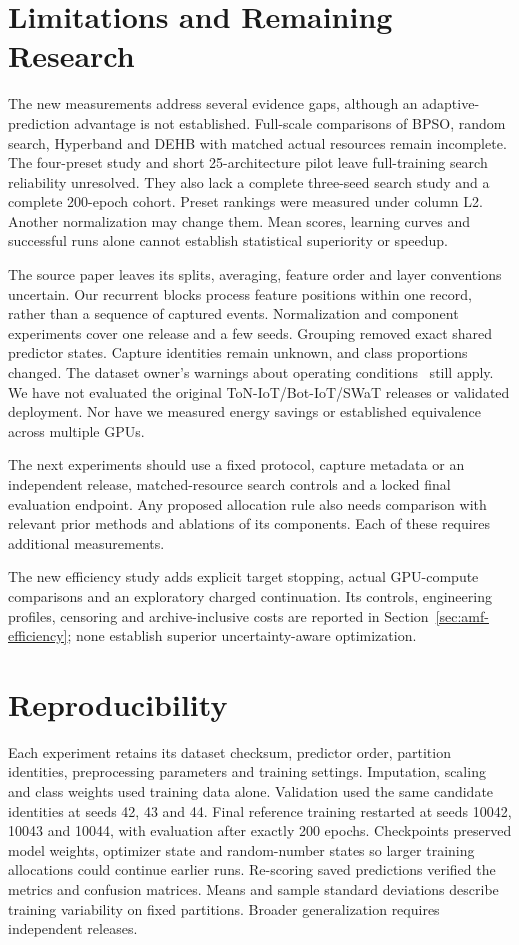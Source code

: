 \FloatBarrier



\section{Limitations and Remaining Research}
The new measurements address several evidence gaps, although an adaptive-prediction advantage is not established. Full-scale comparisons of BPSO, random search, Hyperband and DEHB with matched actual resources remain incomplete. The four-preset study and short 25-architecture pilot leave full-training search reliability unresolved. They also lack a complete three-seed search study and a complete 200-epoch cohort. Preset rankings were measured under column L2. Another normalization may change them. Mean scores, learning curves and successful runs alone cannot establish statistical superiority or speedup.

The source paper leaves its splits, averaging, feature order and layer conventions uncertain. Our recurrent blocks process feature positions within one record, rather than a sequence of captured events. Normalization and component experiments cover one release and a few seeds. Grouping removed exact shared predictor states. Capture identities remain unknown, and class proportions changed. The dataset owner's warnings about operating conditions~\cite{morrisdata,hsu2014} still apply. We have not evaluated the original ToN-IoT/Bot-IoT/SWaT releases or validated deployment. Nor have we measured energy savings or established equivalence across multiple GPUs.

The next experiments should use a fixed protocol, capture metadata or an independent release, matched-resource search controls and a locked final evaluation endpoint. Any proposed allocation rule also needs comparison with relevant prior methods and ablations of its components. Each of these requires additional measurements.

The new efficiency study adds explicit target stopping, actual GPU-compute comparisons and an exploratory charged continuation. Its controls, engineering profiles, censoring and archive-inclusive costs are reported in Section~\ref{sec:amf-efficiency}; none establish superior uncertainty-aware optimization.

\section{Reproducibility}
Each experiment retains its dataset checksum, predictor order, partition identities, preprocessing parameters and training settings. Imputation, scaling and class weights used training data alone. Validation used the same candidate identities at seeds 42, 43 and 44. Final reference training restarted at seeds 10042, 10043 and 10044, with evaluation after exactly 200 epochs. Checkpoints preserved model weights, optimizer state and random-number states so larger training allocations could continue earlier runs. Re-scoring saved predictions verified the metrics and confusion matrices. Means and sample standard deviations describe training variability on fixed partitions. Broader generalization requires independent releases.

